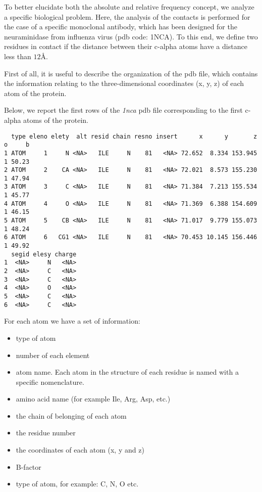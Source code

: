 \documentclass[
  letterpaper,
  DIV=11,
  numbers=noendperiod]{scrreprt}
\begin{document}
To better elucidate both the absolute and relative frequency concept, we
analyze a specific biological problem. Here, the analysis of the
contacts is performed for the case of a specific monoclonal antibody,
which has been designed for the neuraminidase from influenza virus (pdb
code: 1NCA). To this end, we define two residues in contact if the
distance between their c-alpha atoms have a distance less than \(12 Å\).

First of all, it is useful to describe the organization of the pdb file,
which contains the information relating to the three-dimensional
coordinates (x, y, z) of each atom of the protein.

Below, we report the first rows of the \emph{1nca} pdb file
corresponding to the first c-alpha atoms of the protein.

\begin{verbatim}
  type eleno elety  alt resid chain resno insert      x      y       z o     b
1 ATOM     1     N <NA>   ILE     N    81   <NA> 72.652  8.334 153.945 1 50.23
2 ATOM     2    CA <NA>   ILE     N    81   <NA> 72.021  8.573 155.230 1 47.94
3 ATOM     3     C <NA>   ILE     N    81   <NA> 71.384  7.213 155.534 1 45.77
4 ATOM     4     O <NA>   ILE     N    81   <NA> 71.369  6.388 154.609 1 46.15
5 ATOM     5    CB <NA>   ILE     N    81   <NA> 71.017  9.779 155.073 1 48.24
6 ATOM     6   CG1 <NA>   ILE     N    81   <NA> 70.453 10.145 156.446 1 49.92
  segid elesy charge
1  <NA>     N   <NA>
2  <NA>     C   <NA>
3  <NA>     C   <NA>
4  <NA>     O   <NA>
5  <NA>     C   <NA>
6  <NA>     C   <NA>
\end{verbatim}

For each atom we have a set of information:

\begin{itemize}
\item
  type of atom
\item
  number of each element
\item
  atom name. Each atom in the structure of each residue is named with a
  specific nomenclature.
\item
  amino acid name (for example Ile, Arg, Asp, etc.)
\item
  the chain of belonging of each atom
\item
  the residue number
\item
  the coordinates of each atom (x, y and z)
\item
  B-factor
\item
  type of atom, for example: C, N, O etc.
\end{itemize}
\end{document}
